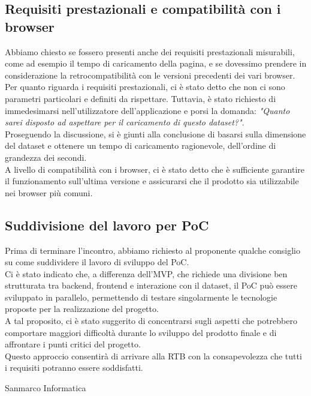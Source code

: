 \subsection{Requisiti prestazionali e compatibilità con i browser}
Abbiamo chiesto se fossero presenti anche dei requisiti prestazionali misurabili, come ad esempio il tempo di caricamento della pagina, e se dovessimo prendere in considerazione la retrocompatibilità con le versioni precedenti dei vari browser.\\
Per quanto riguarda i requisiti prestazionali, ci è stato detto che non ci sono parametri particolari e definiti da rispettare. Tuttavia, è stato richiesto di immedesimarsi nell'utilizzatore dell'applicazione e porsi la domanda: \textit{"Quanto sarei disposto ad aspettare per il caricamento di questo dataset?"}.\\
Proseguendo la discussione, si è giunti alla conclusione di basarsi sulla dimensione del dataset e ottenere un tempo di caricamento ragionevole, dell'ordine di grandezza dei secondi.\\
A livello di compatibilità con i browser, ci è stato detto che è sufficiente garantire il funzionamento sull'ultima versione e assicurarsi che il prodotto sia utilizzabile nei browser più comuni.\\
\subsection{Suddivisione del lavoro per PoC}
Prima di terminare l'incontro, abbiamo richiesto al proponente qualche consiglio su come suddividere il lavoro di sviluppo del PoC.\\
Ci è stato indicato che, a differenza dell'MVP, che richiede una divisione ben strutturata tra backend, frontend e interazione con il dataset, il PoC può essere sviluppato in parallelo, permettendo di testare singolarmente le tecnologie proposte per la realizzazione del progetto.\\
A tal proposito, ci è stato suggerito di concentrarsi sugli aspetti che potrebbero comportare maggiori difficoltà durante lo sviluppo del prodotto finale e di affrontare i punti critici del progetto.\\
Questo approccio consentirà di arrivare alla RTB con la consapevolezza che tutti i requisiti potranno essere soddisfatti.\\

\hfill\signature{Approvazione esterna}{Sanmarco Informatica}
